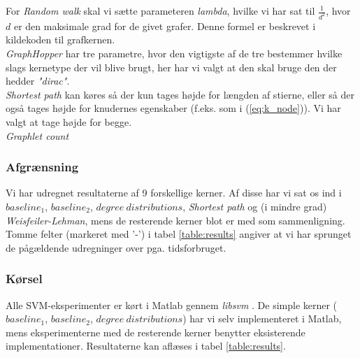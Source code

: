 \documentclass{article}
\begin{document}
For \textit{Random walk} skal vi sætte parameteren \textit{lambda}, hvilke vi har sat til $\frac{1}{d^2}$, hvor $d$ er den maksimale grad for de givet grafer. Denne formel er beskrevet i kildekoden til grafkernen.\\
\textit{GraphHopper} har tre parametre, hvor den vigtigste af de tre bestemmer hvilke slags kernetype der vil blive brugt, her har vi valgt at den skal bruge den der hedder \textit{"dirac"}.\\
\textit{Shortest path} kan køres så der kun tages højde for længden af stierne, eller så der også tages højde for knudernes egenskaber (f.eks. som i (\ref{eq:k_node})). Vi har valgt at tage højde for begge.\\
\textit{Graphlet count}

\subsubsection{Afgrænsning}
Vi har udregnet resultaterne af 9 forskellige kerner. Af disse har vi sat os ind i $baseline_1$, $baseline_2$, $degree\ distributions$, \textit{Shortest path} og (i mindre grad) \textit{Weisfeiler-Lehman}, mens de resterende kerner blot er med som sammenligning. Tomme felter (markeret med '-') i tabel \ref{table:results} angiver at vi har sprunget de pågældende udregninger over pga. tidsforbruget.

\subsubsection{Kørsel}
Alle SVM-eksperimenter er kørt i Matlab gennem \textit{libsvm} \cite{libsvm}. De simple kerner ($baseline_1$, $baseline_2$, $degree\ distributions$) har vi selv implementeret i Matlab, mens eksperimenterne med de resterende kerner benytter eksisterende implementationer. Resultaterne kan aflæses i tabel \ref{table:results}.
\end{document}
